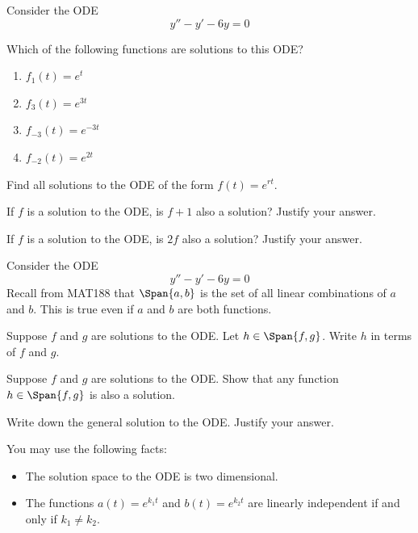 \documentclass{workbook}
\begin{document}
\begin{slide}
	\question
	Consider the ODE
	\[
		y''-y'-6y=0
	\]
	\begin{parts}
		\item Which of the following functions are solutions to this ODE?
		\begin{enumerate}
			\item $f_1(t)=e^t$
			\item $f_3(t)=e^{3t}$
			\item $f_{-3}(t)=e^{-3t}$
			\item $f_{-2}(t)=e^{2t}$
		\end{enumerate}
		\item Find all solutions to the ODE of the form $f(t)=e^{rt}$.
		\item If $f$ is a solution to the ODE, is $f+1$ also a solution? Justify your answer.
		\item If $f$ is a solution to the ODE, is $2f$ also a solution? Justify your answer.
	\end{parts}
\end{slide}


\begin{slide}
	\question
	Consider the ODE
	\[
		y''-y'-6y=0
	\]
	Recall from MAT188 that $\Span\{a,b\}$ is the set of all linear combinations of $a$ and $b$. This is true even if $a$ and $b$ are both 
	functions.

	\begin{parts}
		\item Suppose $f$ and $g$ are solutions to the ODE. 
		Let $h\in\Span\{f,g\}$. Write $h$ in terms of $f$ and $g$.
		\item Suppose $f$ and $g$ are solutions to the ODE. Show that
		any function $h\in \Span\{f,g\}$ is also a solution.

		\item Write down the general solution to the ODE. Justify your answer.

		You may use the following facts:
		\begin{itemize}
			\item The solution space to the ODE is two dimensional.
			\item The functions $a(t)=e^{k_1t}$ and $b(t)=e^{k_2t}$
			are linearly independent if and only if $k_1\neq k_2$.
		\end{itemize}
	\end{parts}
\end{slide}
\end{document}
